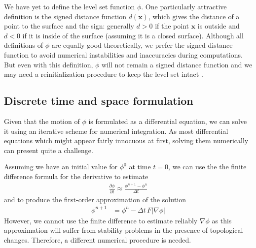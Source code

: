 \documentclass{article}
\begin{document}
We have yet to define the level set function $\phi$. One particularly
attractive definition is the signed distance function $d(\mathbf{x})$, which
gives the distance of a point to the surface and the sign: generally $d > 0$
if the point $\mathbf{x}$ is outside and $d < 0$ if it is inside of the
surface (assuming it is a closed surface). Although all definitions of $\phi$
are equally good theoretically, we prefer the signed distance function to
avoid numerical instabilities and inaccuracies during computations. But even
with this definition, $\phi$ will not remain a signed distance function and we
may need a reinitialization procedure to keep the level set intact
\cite{peng1999pde}.

\subsection{Discrete time and space formulation}
Given that the motion of $\phi$ is formulated as a differential equation, we
can solve it using an iterative scheme for numerical integration. As most
differential equations which might appear fairly innocuous at first, solving
them numerically can present quite a challenge.

Assuming we have an initial value for $\phi^0$ at time $t=0$, we can use the the
finite difference formula for the derivative to estimate
\begin{align}
  \frac{\partial \phi}{\partial t} \approx \frac{\phi^{n+1} - \phi^{n}}{\Delta t}
\end{align}
and to produce the first-order approximation of the solution
\begin{align}
  \phi^{n+1} &= \phi^{n} - \Delta t \, F |\nabla \phi|
\end{align}
However, we cannot use the finite difference to estimate reliably $\nabla
\phi$ as this approximation will suffer from stability problems in the
presence of topological changes. Therefore, a different numerical procedure is
needed.
\end{document}
